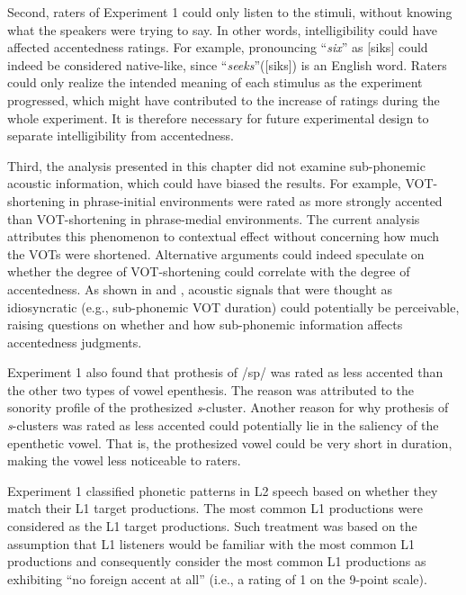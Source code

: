 Second, raters of Experiment 1 could only listen to the stimuli, without knowing what the speakers were trying to say. In other words, intelligibility could have affected accentedness ratings. For example, pronouncing “\textit{six}” as [siks] could indeed be considered native-like, since “\textit{seeks}”([siks]) is an English word. Raters could only realize the intended meaning of each stimulus as the experiment progressed, which might have contributed to the increase of ratings during the whole experiment. It is therefore necessary for future experimental design to separate intelligibility from accentedness. 

Third, the analysis presented in this chapter did not examine sub-phonemic acoustic information, which could have biased the results. For example, VOT-shortening in phrase-initial environments were rated as more strongly accented than VOT-shortening in phrase-medial environments. The current analysis attributes this phenomenon to contextual effect without concerning how much the VOTs were shortened. Alternative arguments could indeed speculate on whether the degree of VOT-shortening could correlate with the degree of accentedness. As shown in \citet{Goldinger_1998} and \citet{Nielsen_2011}, acoustic signals that were thought as idiosyncratic (e.g., sub-phonemic VOT duration) could potentially be perceivable, raising questions on whether and how sub-phonemic information affects accentedness judgments. 

Experiment 1 also found that prothesis of /sp/ was rated as less accented than the other two types of vowel epenthesis. The reason was attributed to the sonority profile of the prothesized \textit{s}-cluster. Another reason for why prothesis of \textit{s}-clusters was rated as less accented could potentially lie in the saliency of the epenthetic vowel. That is, the prothesized vowel could be very short in duration, making the vowel less noticeable to raters. 

Experiment 1 classified phonetic patterns in L2 speech based on whether they match their L1 target productions. The most common L1 productions were considered as the L1 target productions. Such treatment was based on the assumption that L1 listeners would be familiar with the most common L1 productions and consequently consider the most common L1 productions as exhibiting “no foreign accent at all” (i.e., a rating of 1 on the 9-point scale). 

